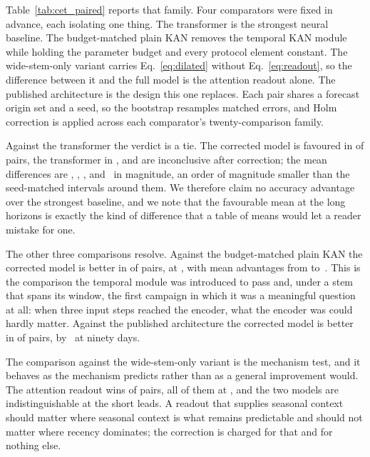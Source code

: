 Table~\ref{tab:cet_paired} reports that family. Four comparators were fixed in advance, each isolating one thing. The transformer is the strongest neural baseline. The budget-matched plain KAN removes the temporal KAN module while holding the parameter budget and every protocol element constant. The wide-stem-only variant carries Eq.~\eqref{eq:dilated} without Eq.~\eqref{eq:readout}, so the difference between it and the full model is the attention readout alone. The published architecture is the design this one replaces. Each pair shares a forecast origin set and a seed, so the bootstrap resamples matched errors, and Holm correction is applied across each comparator's twenty-comparison family.


Against the transformer the verdict is a tie. The corrected model is favoured in \pairedTransformerWins{} of \pairedTransformerTotal{} pairs, the transformer in \pairedTransformerLosses{}, and \pairedTransformerTied{} are inconclusive after correction; the mean differences are \pairedTransformerOne{}, \pairedTransformerSeven{}, \pairedTransformerThirty{}, and \pairedTransformerNinety{}\,\degC{} in magnitude, an order of magnitude smaller than the seed-matched intervals around them. We therefore claim no accuracy advantage over the strongest baseline, and we note that the favourable mean at the long horizons is exactly the kind of difference that a table of means would let a reader mistake for one.

The other three comparisons resolve. Against the budget-matched plain KAN the corrected model is better in \pairedKanWins{} of \pairedKanTotal{} pairs, at \pairedKanWinHorizons{}, with mean advantages from \pairedKanNinety{} to \pairedKanSeven{}\,\degC{}. This is the comparison the temporal module was introduced to pass and, under a stem that spans its window, the first campaign in which it was a meaningful question at all: when three input steps reached the encoder, what the encoder was could hardly matter. Against the published architecture the corrected model is better in \pairedPublishedWins{} of \pairedPublishedTotal{} pairs, by \pairedPublishedNinety{}\,\degC{} at ninety days.

The comparison against the wide-stem-only variant is the mechanism test, and it behaves as the mechanism predicts rather than as a general improvement would. The attention readout wins \pairedDilatedWins{} of \pairedDilatedTotal{} pairs, all of them at \pairedDilatedWinHorizons{}, and the two models are indistinguishable at the short leads. A readout that supplies seasonal context should matter where seasonal context is what remains predictable and should not matter where recency dominates; the correction is charged for that and for nothing else.

